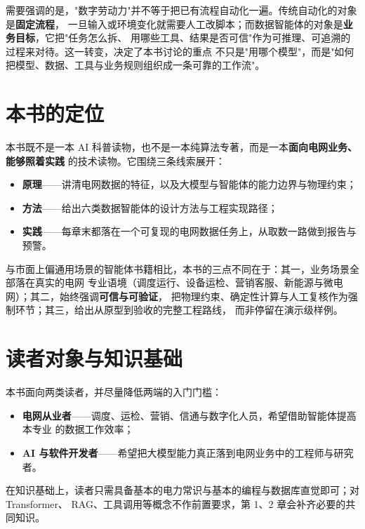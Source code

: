\documentclass[UTF8,a4paper,12pt]{ctexart}
\begin{document}
需要强调的是，"数字劳动力"并不等于把已有流程自动化一遍。传统自动化的对象是\textbf{固定流程}，
一旦输入或环境变化就需要人工改脚本；而数据智能体的对象是\textbf{业务目标}，它把"任务怎么拆、
用哪些工具、结果是否可信"作为可推理、可追溯的过程来对待。这一转变，决定了本书讨论的重点
不只是"用哪个模型"，而是"如何把模型、数据、工具与业务规则组织成一条可靠的工作流"。

\section{本书的定位}

本书既不是一本 AI 科普读物，也不是一本纯算法专著，而是一本\textbf{面向电网业务、能够照着实践}
的技术读物。它围绕三条线索展开：

\begin{itemize}[leftmargin=2em,itemsep=2pt]
  \item \textbf{原理}——讲清电网数据的特征，以及大模型与智能体的能力边界与物理约束；
  \item \textbf{方法}——给出六类数据智能体的设计方法与工程实现路径；
  \item \textbf{实践}——每章末都落在一个可复现的电网数据任务上，从取数一路做到报告与预警。
\end{itemize}

与市面上偏通用场景的智能体书籍相比，本书的三点不同在于：其一，业务场景全部落在真实的电网
专业语境（调度运行、设备运检、营销客服、新能源与微电网）；其二，始终强调\textbf{可信与可验证}，
把物理约束、确定性计算与人工复核作为强制环节；其三，给出从原型到验收的完整工程路线，
而非停留在演示级样例。

\section{读者对象与知识基础}

本书面向两类读者，并尽量降低两端的入门门槛：

\begin{itemize}[leftmargin=2em,itemsep=2pt]
  \item \textbf{电网从业者}——调度、运检、营销、信通与数字化人员，希望借助智能体提高本专业
        的数据工作效率；
  \item \textbf{AI 与软件开发者}——希望把大模型能力真正落到电网业务中的工程师与研究者。
\end{itemize}

在知识基础上，读者只需具备基本的电力常识与基本的编程与数据库直觉即可；对 Transformer、
RAG、工具调用等概念不作前置要求，第 1、2 章会补齐必要的共同知识。
\end{document}
